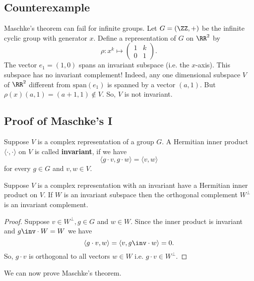 \documentclass[12pt, a4paper]{article}
\begin{document}
\subsection{Counterexample}

\begin{example}
    Maschke's theorem can fail for infinite groups. Let \(G = (\ZZ,+)\) be the infinite cyclic group with generator \(x\). Define a representation of \(G\) on \(\RR^2\) by 
    \[\rho:x^k \mapsto \begin{pmatrix} 1 &k \\ 0 & 1\end{pmatrix}.\]
    The vector \(e_1 =(1,0)\) spans an invariant subspace (i.e. the \(x\)-axis). This subspace has no invariant complement! Indeed, any one dimensional subspace \(V\) of \(\RR^2\) different from \(\text{span}(e_1)\) is spanned by a vector \((a,1)\). But \(\rho(x)(a,1)=(a+1,1) \not\in V\). So, \(V\) is not invariant.
\end{example}

\subsection{Proof of Maschke's I}

\begin{definition}
    Suppose \(V\) is a complex representation of a group \(G\). A Hermitian inner product \(\langle \cdot,\cdot \rangle \) on \(V\) is called \textbf{invariant}, if we have 
    \[\langle g \cdot v , g\cdot w\rangle = \langle v,w \rangle \]
    for every \(g \in G\) and \(v,w\in V\).
\end{definition}

\begin{lemma}
    Suppose \(V\) is a complex representation with an invariant have a Hermitian inner product on \(V\). If \(W\) is an invariant subspace then the orthogonal complement \(W^{\perp}\) is an invariant complement.
\end{lemma}

\begin{proof}
    Suppose \(v \in W^{\perp} ,g \in G\) and \(w \in W\). Since the inner product is invariant and \(g\inv \cdot W =W\) we have 
    \[\langle g\cdot v,w\rangle = \langle v,g\inv\cdot w\rangle=0.\]
    So, \(g\cdot v\) is orthogonal to all vectors \(w \in W\) i.e. \(g\cdot v \in W^{\perp}\).
\end{proof}

\noindent We can now prove Maschke's theorem.
\end{document}
